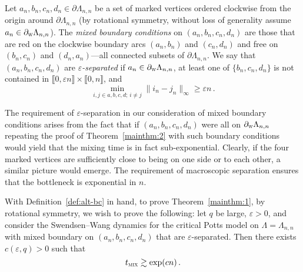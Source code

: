 \documentclass[reqno,11pt]{amsart}
\numberwithin{equation}{section}
\renewcommand{\epsilon}{\varepsilon}
\theoremstyle{definition}{
\newtheorem{example}[theorem]{Example}
\newtheorem{definition}[theorem]{Definition}
\newtheorem*{definition*}{Definition}
\newtheorem{problem}[theorem]{Problem}
\newtheorem{question}[theorem]{Question}
\newtheorem{remark}[theorem]{Remark}
}
\newcommand{\llb }{\llbracket}
\newcommand{\rrb }{\rrbracket}
\renewcommand{\epsilon}{\varepsilon}
\newcommand{\tmix}{t_{\textsc{mix}}}
\newcommand{\west}{{\textsc{w}}}
\begin{document}
\begin{definition}\label{def:alt-bc}
Let $a_n,b_n,c_n,d_n \in \partial \Lambda_{n,n}$ be a set of marked vertices ordered clockwise from the origin around $\partial \Lambda_{n,n}$ (by rotational symmetry, without loss of generality assume $a_n\in \partial_\west \Lambda_{n,n}$).
The \emph{mixed boundary conditions} on $(a_n,b_n,c_n,d_n)$ are those that are red on the clockwise boundary arcs $(a_n,b_n)$ and $(c_n,d_n)$ and  free on $(b_n,c_n)$ and $(d_n,a_n)$---all connected subsets of $\partial \Lambda_{n,n}$. We say that $(a_n,b_n,c_n,d_n)$ are \emph{$\epsilon$-separated} if $a_n\in \partial_\west \Lambda_{n,n}$, at least one of $\{b_n,c_n,d_n\}$ is not contained in $\llb 0,\epsilon n\rrb \times \llb 0,n\rrb$, and
\[\min _{i,j\in a,b,c,d; \, i\neq j} \|i_n - j_n\|_\infty\geq \epsilon n\,.
\]
\end{definition}

\begin{remark}\label{rem:epsilon-separated}
The requirement of $\epsilon$-separation in our consideration of mixed boundary conditions arises from the fact that if $(a_n,b_n,c_n,d_n)$ were all on $\partial_\west \Lambda_{n,n}$ repeating the proof of Theorem~\ref{mainthm:2} with such boundary conditions would yield that the mixing time is in fact sub-exponential. Clearly, if the four marked vertices are sufficiently close to being on one side or to each other, a similar picture would emerge. The requirement of macroscopic separation ensures that the bottleneck is exponential in $n$.
\end{remark}

With Definition~\ref{def:alt-bc} in hand, to prove Theorem~\ref{mainthm:1}, by rotational symmetry, we wish to prove the following: let $q$ be large, $\epsilon>0$, and consider the Swendsen--Wang dynamics for the critical Potts model on $\Lambda=\Lambda_{n,n}$ with mixed boundary on $(a_n,b_n,c_n,d_n)$ that are $\epsilon$-separated.
Then there exists $c(\epsilon, q)>0$ such that
\[\tmix\gtrsim \exp(c n)\,.
\]
\end{document}
